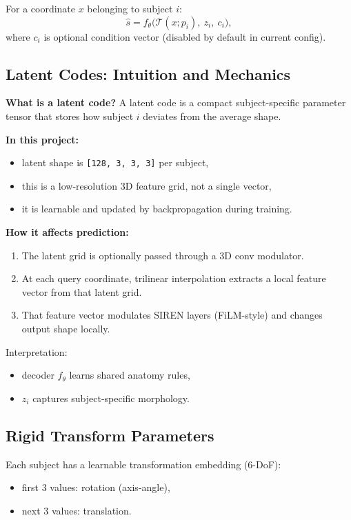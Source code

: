 ﻿\documentclass[11pt]{article}
\begin{document}
For a coordinate $x$ belonging to subject $i$:
\begin{equation}
\hat{s}=f_\theta\big(\mathcal{T}(x; p_i),\ z_i,\ c_i\big),
\end{equation}
where $c_i$ is optional condition vector (disabled by default in current config).

\subsection{Latent Codes: Intuition and Mechanics}
\textbf{What is a latent code?}
A latent code is a compact subject-specific parameter tensor that stores how subject $i$ deviates from the average shape.

\textbf{In this project:}
\begin{itemize}[leftmargin=*]
    \item latent shape is \texttt{[128, 3, 3, 3]} per subject,
    \item this is a low-resolution 3D feature grid, not a single vector,
    \item it is learnable and updated by backpropagation during training.
\end{itemize}

\textbf{How it affects prediction:}
\begin{enumerate}[leftmargin=*]
    \item The latent grid is optionally passed through a 3D conv modulator.
    \item At each query coordinate, trilinear interpolation extracts a local feature vector from that latent grid.
    \item That feature vector modulates SIREN layers (FiLM-style) and changes output shape locally.
\end{enumerate}

Interpretation:
\begin{itemize}[leftmargin=*]
    \item decoder $f_\theta$ learns shared anatomy rules,
    \item $z_i$ captures subject-specific morphology.
\end{itemize}

\subsection{Rigid Transform Parameters}
Each subject has a learnable transformation embedding (6-DoF):
\begin{itemize}[leftmargin=*]
    \item first 3 values: rotation (axis-angle),
    \item next 3 values: translation.
\end{itemize}
\end{document}
